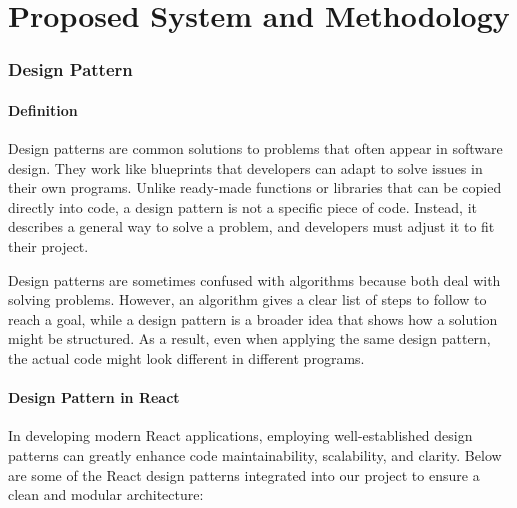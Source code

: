 \chapter{Proposed System and Methodology}

\subsection{Design Pattern}
\subsubsection{Definition}
Design patterns are common solutions to problems that often appear in software design. They work like blueprints that developers can adapt to solve issues in their own programs.
Unlike ready-made functions or libraries that can be copied directly into code, a design pattern is not a specific piece of code. Instead, it describes a general way to solve a problem, and developers must adjust it to fit their project.

Design patterns are sometimes confused with algorithms because both deal with solving problems. However, an algorithm gives a clear list of steps to follow to reach a goal, while a design pattern is a broader idea that shows how a solution might be structured. As a result, even when applying the same design pattern, the actual code might look different in different programs.


\subsubsection{Design Pattern in React}
In developing modern React applications, employing well-established design patterns can greatly enhance code maintainability, scalability, and clarity. Below are some of the React design patterns integrated into our project to ensure a clean and modular architecture:

